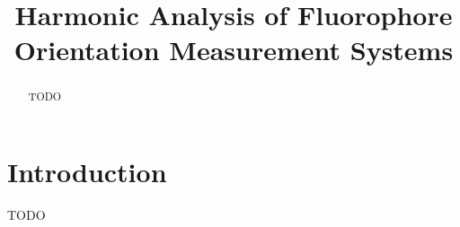 \documentclass[10pt]{article}
\begin{document}
\title{\vspace{-2.5em} Harmonic Analysis of Fluorophore Orientation Measurement Systems \vspace{-1em}}
\maketitle


\begin{abstract} 
TODO 
\end{abstract}






\section{Introduction}\label{sec:intro}
TODO
\end{document}
